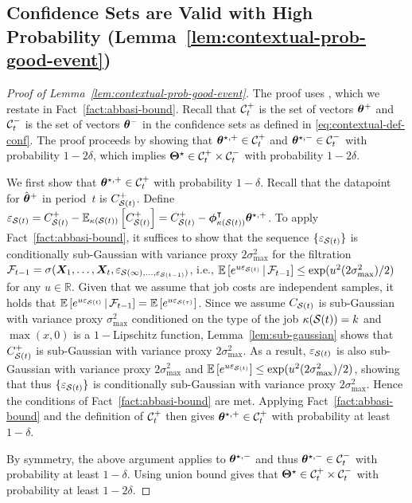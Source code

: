 \subsection{Confidence Sets are Valid with High Probability (Lemma~\ref{lem:contextual-prob-good-event})}\label{app:lem-contextual-prob-good-event}
\begin{proof}[Proof of Lemma~\ref{lem:contextual-prob-good-event}]
The proof uses \cite[Theorem~2]{Abbasi-YadkoriPS11}, which we restate in Fact~\ref{fact:abbasi-bound}. Recall that $\mathcal{C}^+_t$ is the set of vectors $\boldsymbol{\theta}^+$ and $\mathcal{C}^-_t$ is the set of vectors $\boldsymbol{\theta}^-$ in the confidence sets as defined in \eqref{eq:contextual-def-conf}. The proof proceeds by showing that $\boldsymbol{\theta}^{\star,+} \in \mathcal{C}^+_t$ and $\boldsymbol{\theta}^{\star,-} \in \mathcal{C}^-_t$ with probability $1 - 2\delta$, which implies $\boldsymbol{\Theta}^\star \in \mathcal{C}_t^+ \times \mathcal{C}_t^-$ with probability $1-2\delta$.

We first show that $\boldsymbol{\theta}^{\star,+} \in \mathcal{C}^+_t$ with probability $1-\delta$. Recall that the datapoint for $\hat{\boldsymbol{\theta}}^+$ in period~$t$ is $C^+_{\mathcal{S}(t)}$. Define $\varepsilon_{\mathcal{S}(t)} = C^+_{\mathcal{S}(t)} - \mathbb E_{\kappa(\mathcal{S}(t))}\left[C^+_{\mathcal{S}(t)}\right] = C^+_{\mathcal{S}(t)} - \boldsymbol{\phi}_{\kappa(\mathcal{S}(t))}^{\intercal}\boldsymbol{\theta}^{\star,+}$. To apply Fact~\ref{fact:abbasi-bound}, it suffices to show that the sequence $\{\varepsilon_{\mathcal{S}(t)}\}$ is conditionally sub-Gaussian with variance proxy $2\sigma^2_{\max}$ for the filtration $\mathcal{F}_{t-1} = \sigma(\boldsymbol{X}_1,\ldots,\boldsymbol{X}_t,\varepsilon_{\mathcal{S(1)},\ldots,\varepsilon_{\mathcal{S}(t - 1)})}$, i.e., $\mathbb E\left[e^{u\varepsilon_{\mathcal{S}(t)}} \,\middle\vert\, \mathcal{F}_{t-1}\right] \leq \exp(u^2(2\sigma_{\max}^2)/2)$ for any $u \in \mathbb{R}$. Given that we assume that job costs are independent samples, it holds that $\mathbb E\left[e^{u\varepsilon_{\mathcal{S}(t)}} \,\middle\vert\, \mathcal{F}_{t-1}\right] = \mathbb E\left[e^{u\varepsilon_{\mathcal{S}(\tau)}}\right]$. Since we assume $C_{\mathcal{S}(t)}$ is sub-Gaussian with variance proxy $\sigma_{\max}^2$ conditioned on the type of the job $\kappa(\mathcal{S}(t)) = k$ and $\max(x,0)$ is a $1-$Lipschitz function, Lemma~\ref{lem:sub-gaussian} shows that $C_{\mathcal{S}(t)}^+$ is sub-Gaussian with variance proxy $2\sigma_{\max}^2$. As a result, $\varepsilon_{\mathcal{S}(t)}$ is also sub-Gaussian with variance proxy $2\sigma_{\max}^2$ and $\mathbb E\left[e^{u\varepsilon_{\mathcal{S}(t)}}\right] \leq \exp(u^2(2\sigma_{\max}^2) / 2)$, showing that thus $\{\varepsilon_{\mathcal{S}(t)}\}$ is conditionally sub-Gaussian with variance proxy $2\sigma_{\max}^2$. Hence the conditions of Fact~\ref{fact:abbasi-bound} are met. Applying Fact~\ref{fact:abbasi-bound} and the definition of $\mathcal{C}^{+}_t$  then gives $\boldsymbol{\theta}^{\star,+} \in \mathcal{C}_t^+$ with probability at least $1-\delta$.

By symmetry, the above argument applies to $\boldsymbol{\theta}^{\star,-}$ and thus $\boldsymbol{\theta}^{\star,-} \in \mathcal{C}_t^-$ with probability at least $1 - \delta$. Using union bound gives that $\boldsymbol{\Theta}^\star \in \mathcal{C}_t^+ \times \mathcal{C}_t^-$ with probability at least $1-2\delta$.
\end{proof}

